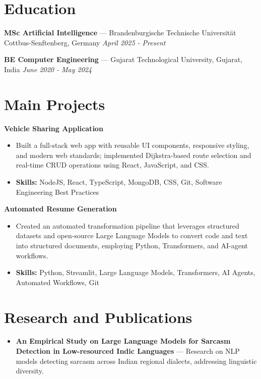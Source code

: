 \documentclass[a4paper,10pt]{article}
\begin{document}
\section*{Education}
\textbf{MSc Artificial Intelligence} — Brandenburgische Technische Universität Cottbus-Senftenberg, Germany \hfill \textit{April 2025 - Present}\par
\vspace{1.5pt}
\textbf{BE Computer Engineering} — Gujarat Technological University, Gujarat, India \hfill \textit{June 2020 - May 2024}\par

\section*{Main Projects}
\textbf{Vehicle Sharing Application}\par
\vspace{1pt}
\begin{itemize}
  \item Built a full-stack web app with reusable UI components, responsive styling, and modern web standards; implemented Dijkstra-based route selection and real-time CRUD operations using React, JavaScript, and CSS.
  \item \textbf{Skills:} NodeJS, React, TypeScript, MongoDB, CSS, Git, Software Engineering Best Practices
\end{itemize}
\vspace{3pt}
\textbf{Automated Resume Generation}\par
\vspace{1pt}
\begin{itemize}
  \item Created an automated transformation pipeline that leverages structured datasets and open-source Large Language Models to convert code and text into structured documents, employing Python, Transformers, and AI-agent workflows.
  \item \textbf{Skills:} Python, Streamlit, Large Language Models, Transformers, AI Agents, Automated Workflows, Git
\end{itemize}

\section*{Research and Publications}
\begin{itemize}
\item \textbf{An Empirical Study on Large Language Models for Sarcasm Detection in Low-resourced Indic Languages} — Research on NLP models detecting sarcasm across Indian regional dialects, addressing linguistic diversity.
\end{itemize}
\end{document}
